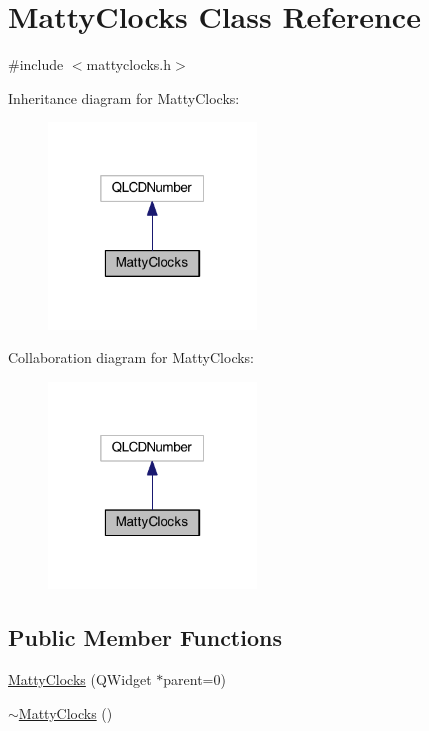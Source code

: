 \hypertarget{classMattyClocks}{}\section{Matty\+Clocks Class Reference}
\label{classMattyClocks}


{\ttfamily \#include $<$mattyclocks.\+h$>$}



Inheritance diagram for Matty\+Clocks\+:
\nopagebreak
\begin{figure}[H]
\begin{center}
\leavevmode
\includegraphics[width=157pt]{classMattyClocks__inherit__graph}
\end{center}
\end{figure}


Collaboration diagram for Matty\+Clocks\+:
\nopagebreak
\begin{figure}[H]
\begin{center}
\leavevmode
\includegraphics[width=157pt]{classMattyClocks__coll__graph}
\end{center}
\end{figure}
\subsection*{Public Member Functions}
\begin{DoxyCompactItemize}
\item 
\hyperlink{classMattyClocks_aa102bc39b1a1cc5aa1722cecf4779bf0}{Matty\+Clocks} (Q\+Widget $\ast$parent=0)
\item 
\hyperlink{classMattyClocks_a62e37b4d89d3ca8f2f42299da93df5a4}{$\sim$\+Matty\+Clocks} ()
\end{DoxyCompactItemize}
